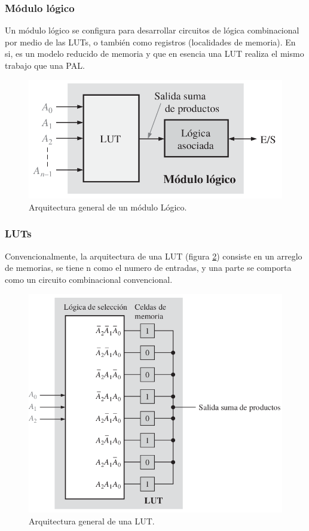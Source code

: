 \documentclass[twoside,spanish,ESP,MSc]{plantillaLabUPV}
\theoremstyle{definition}
\begin{document}
\subsubsection*{Módulo lógico}

Un módulo lógico se configura para desarrollar circuitos de lógica combinacional por medio de las LUTs, o también como registros (localidades de memoria). En si, es un modelo reducido de memoria  y que en esencia una LUT realiza el mismo trabajo que una PAL.\\

\begin{figure}[h]
\centering
\includegraphics[scale=0.275]{ima/ml.png}
\caption{Arquitectura general de un módulo Lógico.%
\label{arqml}}
\end{figure}

\subsubsection*{LUTs}

Convencionalmente, la arquitectura de una LUT (figura \ref{arqlut}) consiste en un arreglo de memorias, se tiene n como el numero de entradas, y una parte se comporta como un circuito combinacional convencional.\\

\begin{figure}[h]
\centering
\includegraphics[scale=0.3]{ima/lut.png}
\caption{Arquitectura general de una LUT.%
\label{arqlut}}
\end{figure}
\end{document}
